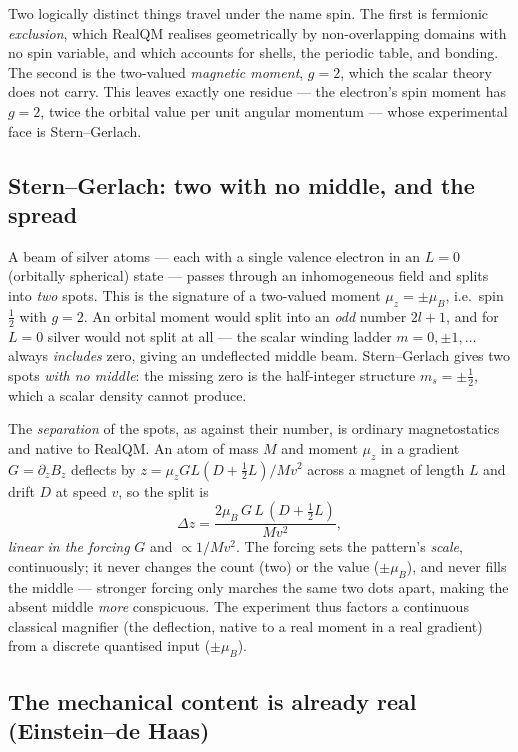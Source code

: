 \documentclass[11pt]{article}
\begin{document}
Two logically distinct things travel under the name spin. The first is fermionic \emph{exclusion}, which RealQM
realises geometrically by non-overlapping domains with no spin variable, and which accounts for shells, the
periodic table, and bonding. The second is the two-valued \emph{magnetic moment}, $g=2$, which the scalar theory
does not carry. This leaves exactly one residue --- the electron's spin moment has $g=2$, twice the orbital value
per unit angular momentum --- whose experimental face is Stern--Gerlach.

\subsection{Stern--Gerlach: two with no middle, and the spread}

A beam of silver atoms --- each with a single valence electron in an $L=0$ (orbitally spherical) state --- passes
through an inhomogeneous field and splits into \emph{two} spots. This is the signature of a two-valued moment
$\mu_z=\pm\mu_B$, i.e.\ spin $\tfrac12$ with $g=2$. An orbital moment would split into an \emph{odd} number
$2l+1$, and for $L=0$ silver would not split at all --- the scalar winding ladder $m=0,\pm1,\dots$ always
\emph{includes} zero, giving an undeflected middle beam. Stern--Gerlach gives two spots \emph{with no middle}: the
missing zero is the half-integer structure $m_s=\pm\tfrac12$, which a scalar density cannot produce.

The \emph{separation} of the spots, as against their number, is ordinary magnetostatics and native to RealQM. An
atom of mass $M$ and moment $\mu_z$ in a gradient $G=\partial_z B_z$ deflects by $z=\mu_z GL(D+\tfrac12 L)/Mv^2$
across a magnet of length $L$ and drift $D$ at speed $v$, so the split is
\begin{equation}
\Delta z = \frac{2\mu_B\,G\,L\,(D+\tfrac12 L)}{M v^2},
\label{eq:spread}
\end{equation}
\emph{linear in the forcing} $G$ and $\propto 1/Mv^2$. The forcing sets the pattern's \emph{scale}, continuously;
it never changes the count (two) or the value ($\pm\mu_B$), and never fills the middle --- stronger forcing only
marches the same two dots apart, making the absent middle \emph{more} conspicuous. The experiment thus factors a
continuous classical magnifier (the deflection, native to a real moment in a real gradient) from a discrete
quantised input ($\pm\mu_B$).

\subsection{The mechanical content is already real (Einstein--de Haas)}
\end{document}
